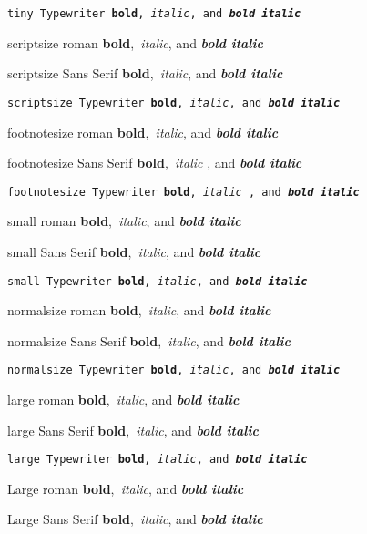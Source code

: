 \documentclass{article}
\begin{document}
\texttt{{\tiny tiny Typewriter \textbf{bold},\textit{\ italic}, and \textbf{%
\textit{bold italic}}}}

{\scriptsize scriptsize roman \textbf{bold},\textit{\ italic}, and \textbf{%
\textit{bold italic}}}

\textsf{{\scriptsize scriptsize Sans Serif \textbf{bold},\textit{\ italic},
and \textbf{\textit{bold italic}}}}

\texttt{{\scriptsize scriptsize Typewriter \textbf{bold},\textit{\ italic},
and \textbf{\textit{bold italic}}}}

{\footnotesize footnotesize roman \textbf{bold},\textit{\ italic}, and 
\textbf{\textit{bold italic}}}

\textsf{{\footnotesize footnotesize Sans Serif \textbf{bold},\textit{\ italic%
}, and \textbf{\textit{bold italic}}}}

\texttt{{\footnotesize footnotesize Typewriter \textbf{bold},\textit{\ italic%
}, and \textbf{\textit{bold italic}}}}

{\small small roman \textbf{bold},\textit{\ italic}, and \textbf{\textit{%
bold italic}}}

\textsf{{\small small Sans Serif \textbf{bold},\textit{\ italic}, and 
\textbf{\textit{bold italic}}}}

\texttt{{\small small Typewriter \textbf{bold},\textit{\ italic}, and 
\textbf{\textit{bold italic}}}}

{\normalsize normalsize roman \textbf{bold},\textit{\ italic}, and \textbf{%
\textit{bold italic}}}

\textsf{{\normalsize normalsize Sans Serif \textbf{bold},\textit{\ italic},
and \textbf{\textit{bold italic}}}}

\texttt{{\normalsize normalsize Typewriter \textbf{bold},\textit{\ italic},
and \textbf{\textit{bold italic}}}}

{\large large roman \textbf{bold},\textit{\ italic}, and \textbf{\textit{%
bold italic}}}

\textsf{{\large large Sans Serif \textbf{bold},\textit{\ italic}, and 
\textbf{\textit{bold italic}}}}

\texttt{{\large large Typewriter \textbf{bold},\textit{\ italic}, and 
\textbf{\textit{bold italic}}}}

{\Large Large roman \textbf{bold},\textit{\ italic}, and \textbf{\textit{%
bold italic}}}

\textsf{{\Large Large Sans Serif \textbf{bold},\textit{\ italic}, and 
\textbf{\textit{bold italic}}}}
\end{document}
